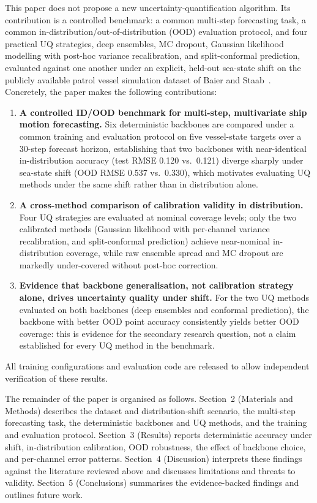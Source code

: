 \documentclass[a4paper,fleqn]{cas-sc}
\begin{document}
This paper does not propose a new uncertainty-quantification algorithm. Its contribution is a controlled benchmark: a common multi-step forecasting task, a common in-distribution/out-of-distribution (OOD) evaluation protocol, and four practical UQ strategies, deep ensembles, MC dropout, Gaussian likelihood modelling with post-hoc variance recalibration, and split-conformal prediction, evaluated against one another under an explicit, held-out sea-state shift on the publicly available patrol vessel simulation dataset of Baier and Staab~\cite{baier2022darus}. Concretely, the paper makes the following contributions:
\begin{enumerate}
    \item \textbf{A controlled ID/OOD benchmark for multi-step, multivariate ship motion forecasting.} Six deterministic backbones are compared under a common training and evaluation protocol on five vessel-state targets over a 30-step forecast horizon, establishing that two backbones with near-identical in-distribution accuracy (test RMSE 0.120 vs.\ 0.121) diverge sharply under sea-state shift (OOD RMSE 0.537 vs.\ 0.330), which motivates evaluating UQ methods under the same shift rather than in distribution alone.
    \item \textbf{A cross-method comparison of calibration validity in distribution.} Four UQ strategies are evaluated at nominal coverage levels; only the two calibrated methods (Gaussian likelihood with per-channel variance recalibration, and split-conformal prediction) achieve near-nominal in-distribution coverage, while raw ensemble spread and MC dropout are markedly under-covered without post-hoc correction.
    \item \textbf{Evidence that backbone generalisation, not calibration strategy alone, drives uncertainty quality under shift.} For the two UQ methods evaluated on both backbones (deep ensembles and conformal prediction), the backbone with better OOD point accuracy consistently yields better OOD coverage: this is evidence for the secondary research question, not a claim established for every UQ method in the benchmark.
\end{enumerate}
All training configurations and evaluation code are released to allow independent verification of these results.

The remainder of the paper is organised as follows. Section~2 (Materials and Methods) describes the dataset and distribution-shift scenario, the multi-step forecasting task, the deterministic backbones and UQ methods, and the training and evaluation protocol. Section~3 (Results) reports deterministic accuracy under shift, in-distribution calibration, OOD robustness, the effect of backbone choice, and per-channel error patterns. Section~4 (Discussion) interprets these findings against the literature reviewed above and discusses limitations and threats to validity. Section~5 (Conclusions) summarises the evidence-backed findings and outlines future work.
\end{document}
